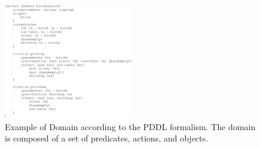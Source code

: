 \begin{figure}[t]
    \centering
    \includegraphics[width=0.5\textwidth]{figures/images/ch4/example_domain_definition.jpg}
    \caption{Example of Domain according to the PDDL formalism. The domain is composed of a set of predicates, actions, and objects.}
    \label{fig:example_domain_definition}
\end{figure}
